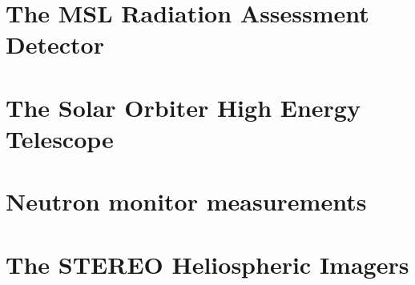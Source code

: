 \section{The MSL Radiation Assessment Detector}
\label{sec:mslrad}

\section{The Solar Orbiter High Energy Telescope}
\label{sec:solohet}

\section{Neutron monitor measurements}
\label{sec:neutronmonitors}

\section{The STEREO Heliospheric Imagers}
\label{sec:stereohi}